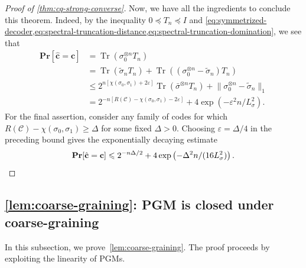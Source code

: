 \documentclass[11pt]{article}
\renewcommand{\leq}{\leqslant}
\renewcommand{\geq}{\geqslant}
\theoremstyle{remark}
\newcommand{\cC}{\mathcal{C}}
\newcommand{\Tr}{\operatorname{Tr}}
\newcommand{\Prb}{\mathbf{Pr}}
\newcommand{\bchat}{\hat{\mathbf{c}}}
\newcommand{\bc}{\mathbf{c}}
\newcommand{\eps}{\varepsilon}
\newcommand{\norm}[1]{\lVert#1\rVert}
\begin{document}
\begin{proof}[Proof of \cref{thm:cq-strong-converse}]
Now, we have all the ingredients to conclude this theorem. Indeed, by the inequality $0\preceq T_n \preceq I$ and \cref{eq:symmetrized-decoder,eq:spectral-truncation-distance,eq:spectral-truncation-domination}, we see that
\begin{align*}
\Prb[\bchat = \bc]
&= \Tr(\sigma_0^{\otimes n}T_n) \\
&= \Tr(\widetilde{\sigma}_nT_n)+\Tr((\sigma_0^{\otimes n}-\widetilde{\sigma}_n)T_n) \\
&\leq 2^{n[\chi(\sigma_0,\sigma_1)+2\eps]}\Tr(\bar{\sigma}^{\otimes n}T_n)
+\norm{\sigma_0^{\otimes n}-\widetilde{\sigma}_n}_1 \\
&= 2^{-n[R(\cC)-\chi(\sigma_0,\sigma_1)-2\eps]}
+4\exp\left(-\eps^2n/L_\sigma^2\right).
\end{align*}
For the final assertion, consider any family of codes for which $R(\cC)-\chi(\sigma_0,\sigma_1)\geq\Delta$ for some fixed $\Delta>0$. Choosing $\eps=\Delta/4$ in the preceding bound gives the exponentially decaying estimate
\begin{equation*}
\Prb[\bchat = \bc]
\leq 2^{-n\Delta/2}+4\exp\left(-\Delta^2n/(16L_\sigma^2)\right).
\qedhere
\end{equation*}
\end{proof}

\subsection{\texorpdfstring{\cref{lem:coarse-graining}}{Lemma }: PGM is closed under coarse-graining}
\label{appsubsec:proof-coarse-graining}

In this subsection, we prove~\cref{lem:coarse-graining}. The proof proceeds by exploiting the linearity of PGMs.
\end{document}
